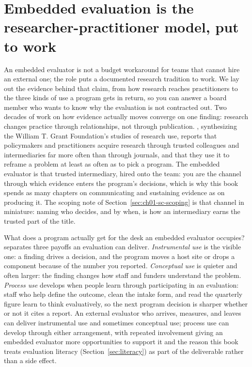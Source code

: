 \documentclass[
    a4paper,
    fontsize=10pt,
    twoside=true,
    numbers=noenddot,
]{kaobook}
\begin{document}
\section{Embedded evaluation is the researcher-practitioner model, put to work}\label{sec:ch01-rpp}
An embedded evaluator is not a budget workaround for teams that cannot hire an external one; the role puts a documented research tradition to work. We lay out the evidence behind that claim, from how research reaches practitioners to the three kinds of use a program gets in return, so you can answer a board member who wants to know why the evaluation is not contracted out. Two decades of work on how evidence actually moves converge on one finding: research changes practice through relationships, not through publication. \textcite{tseng2012uses}, synthesizing the William T. Grant Foundation's studies of research use, reports that policymakers and practitioners acquire research through trusted colleagues and intermediaries far more often than through journals, and that they use it to reframe a problem at least as often as to pick a program. The embedded evaluator is that trusted intermediary, hired onto the team: you are the channel through which evidence enters the program's decisions, which is why this book spends as many chapters on communicating and sustaining evidence as on producing it. The scoping note of Section~\ref{sec:ch01-sc-scoping} is that channel in miniature: naming who decides, and by when, is how an intermediary earns the trusted part of the title.

What does a program actually get for the desk an embedded evaluator occupies? \textcite{patton2008utilization} separates three payoffs an evaluation can deliver. \emph{Instrumental use} is the visible one: a finding drives a decision, and the program moves a host site or drops a component because of the number you reported. \emph{Conceptual use} is quieter and often larger: the finding changes how staff and funders understand the problem. \emph{Process use} develops when people learn through participating in an evaluation: staff who help define the outcome, clean the intake form, and read the quarterly figure learn to think evaluatively, so the next program decision is sharper whether or not it cites a report. An external evaluator who arrives, measures, and leaves can deliver instrumental use and sometimes conceptual use; process use can develop through either arrangement, with repeated involvement giving an embedded evaluator more opportunities to support it and the reason this book treats evaluation literacy (Section~\ref{sec:literacy}) as part of the deliverable rather than a side effect.
\end{document}
